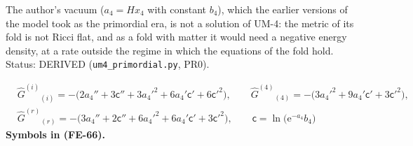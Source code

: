 \documentclass[
  10pt,
]{article}
\begin{document}
The author's vacuum (\(a_4 = Hx_4\) with constant \(b_4\)), which the
earlier versions of the model took as the primordial era, is not a
solution of UM-4: the metric of its fold is not Ricci flat, and as a
fold with matter it would need a negative energy density, at a rate
outside the regime in which the equations of the fold hold. Status:
DERIVED (\texttt{um4\_primordial.py}, PR0).

\[
\begin{aligned}
&\hat G^{(i)}{}_{(i)} = -\big(2a_4'' + 3\mathsf{c}'' + 3a_4'^2 + 6a_4'\mathsf{c}' + 6\mathsf{c}'^2\big),\qquad
 \hat G^{(4)}{}_{(4)} = -\big(3a_4'^2 + 9a_4'\mathsf{c}' + 3\mathsf{c}'^2\big),\\
&\hat G^{(r)}{}_{(r)} = -\big(3a_4'' + 2\mathsf{c}'' + 6a_4'^2 + 6a_4'\mathsf{c}' + 3\mathsf{c}'^2\big),\qquad
 \mathsf{c} = \ln\big(\mathrm{e}^{-a_4}b_4\big)
\end{aligned} \tag{FE-66}
\] \textbf{Symbols in (FE-66).}
\end{document}
